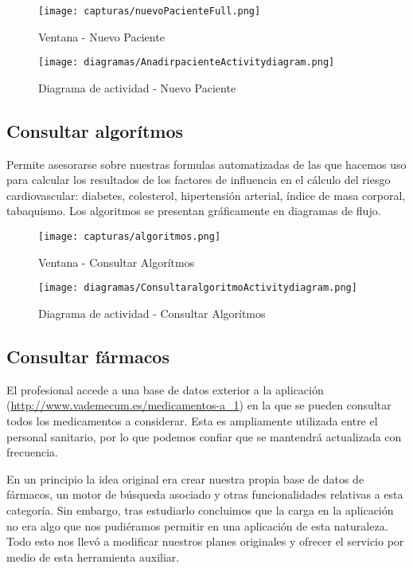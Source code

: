 \documentclass[11pt,spanish,
		listoftables,listoffigures]
		{tfgplantilla}
\begin{document}
\begin{figure}[H]
\centering
\texttt{[image: capturas/nuevoPacienteFull.png]}
\caption{Ventana - Nuevo Paciente}
\end{figure}

\begin{figure}[H]
\centering
\texttt{[image: diagramas/AnadirpacienteActivitydiagram.png]}
\caption{Diagrama de actividad - Nuevo Paciente}
\end{figure}

\subsection {Consultar algorítmos}

Permite asesorarse sobre nuestras formulas automatizadas de las que hacemos uso para calcular los resultados de los factores de influencia en el cálculo del riesgo cardiovascular: diabetes, colesterol, hipertensión arterial, índice de masa corporal, tabaquismo.
Los algoritmos se presentan gráficamente en diagramas de flujo.

\begin{figure}[H]
\centering
\texttt{[image: capturas/algoritmos.png]}
\caption{Ventana - Consultar Algorítmos}
\end{figure}

\begin{figure}[H]
\centering
\texttt{[image: diagramas/ConsultaralgoritmoActivitydiagram.png]}
\caption{Diagrama de actividad -  Consultar Algorítmos}
\end{figure}

\subsection {Consultar fármacos}

El profesional accede a una base de datos exterior a la aplicación (\url {http://www.vademecum.es/medicamentos-a_1}) en la que se pueden consultar todos los medicamentos a considerar. Esta es ampliamente utilizada entre el personal sanitario, por lo que podemos confiar que se mantendrá actualizada con frecuencia.

En un principio la idea original era crear nuestra propia base de datos de fármacos, un motor de búsqueda asociado y otras funcionalidades relativas a esta categoría. Sin embargo, tras estudiarlo concluimos que la carga en la aplicación no era algo que nos pudiéramos permitir en una aplicación de esta naturaleza. Todo esto nos llevó a modificar nuestros planes originales y ofrecer el servicio por medio de esta herramienta auxiliar.
\end{document}
